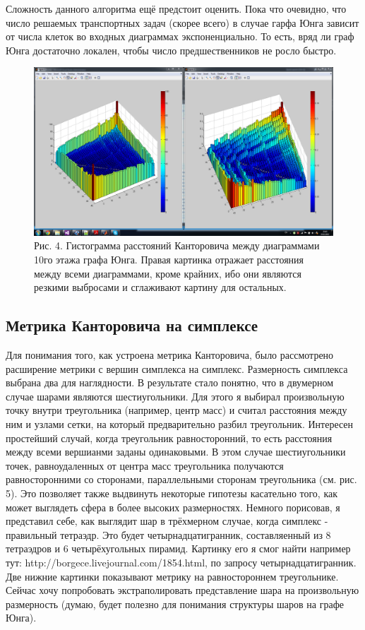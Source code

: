 \documentclass[12pt]{report}
\begin{document}
Сложность данного алгоритма ещё предстоит оценить. Пока что очевидно, что число решаемых транспортных задач (скорее всего) в случае гарфа Юнга зависит от числа клеток во входных диаграммах экспоненциально. То есть, вряд ли граф Юнга достаточно локален, чтобы число предшественников не росло быстро. 

\begin{figure}[!ht]
\begin{center}
\includegraphics[scale=0.3]{metric}
\\Рис. 4. Гистограмма расстояний Канторовича между диаграммами 10го этажа графа Юнга. Правая картинка отражает расстояния между всеми диаграммами, кроме крайних, ибо они являются резкими выбросами и сглаживают картину для остальных.
\end{center}
\end{figure}

\subsection*{Метрика Канторовича на симплексе}

\hspace{\parindent} Для понимания того, как устроена метрика Канторовича, было рассмотрено расширение метрики с вершин симплекса на симплекс. Размерность симплекса выбрана два для наглядности. В результате стало понятно, что в двумерном случае шарами являются шестиугольники. Для этого я выбирал произвольную точку внутри треугольника (например, центр масс) и считал расстояния между ним и узлами сетки, на который предварительно разбил треугольник. Интересен простейший случай, когда треугольник равносторонний, то есть расстояния между всеми вершианми заданы одинаковыми. В этом случае шестиугольники точек, равноудаленных от центра масс треугольника получаются равносторонними со сторонами, параллельными сторонам треугольника (см. рис. 5). Это позволяет также выдвинуть некоторые гипотезы касательно того, как может выглядеть сфера в более высоких размерностях. Немного порисовав, я представил себе, как выглядит шар в трёхмерном случае, когда симплекс - правильный тетраэдр. Это будет четырнадцатигранник, составляенный из 8 тетраэдров и 6 четырёхугольных пирамид. Картинку его я смог найти например тут: http://borgece.livejournal.com/1854.html, по запросу четырнадцатигранник. Две нижние картинки показывают метрику на равностороннем треугольнике.
Сейчас хочу попробовать экстраполировать представление шара на произвольную размерность (думаю, будет полезно для понимания структуры  шаров на графе Юнга).
\end{document}
